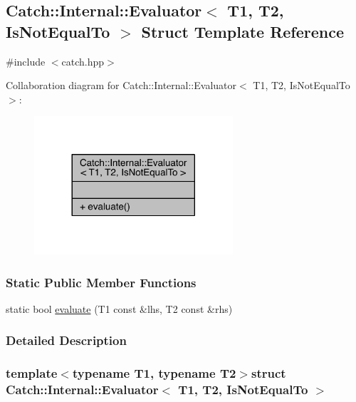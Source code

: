 \hypertarget{a00024}{}\subsection{Catch\+:\+:Internal\+:\+:Evaluator$<$ T1, T2, Is\+Not\+Equal\+To $>$ Struct Template Reference}
\label{a00024}


{\ttfamily \#include $<$catch.\+hpp$>$}



Collaboration diagram for Catch\+:\+:Internal\+:\+:Evaluator$<$ T1, T2, Is\+Not\+Equal\+To $>$\+:\nopagebreak
\begin{figure}[H]
\begin{center}
\leavevmode
\includegraphics[width=209pt]{a00320}
\end{center}
\end{figure}
\subsubsection*{Static Public Member Functions}
\begin{DoxyCompactItemize}
\item 
static bool \hyperlink{a00024_a956a12d0f4a7dceb5a1ce914421ff945}{evaluate} (T1 const \&lhs, T2 const \&rhs)
\end{DoxyCompactItemize}


\subsubsection{Detailed Description}
\subsubsection*{template$<$typename T1, typename T2$>$struct Catch\+::\+Internal\+::\+Evaluator$<$ T1, T2, Is\+Not\+Equal\+To $>$}



